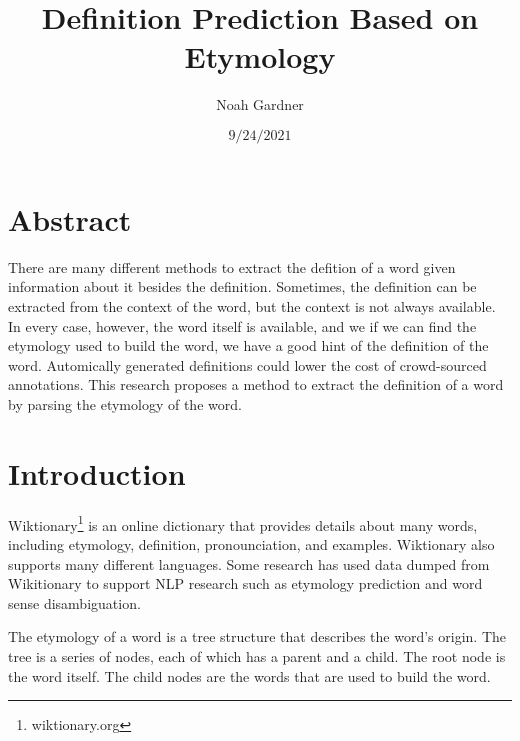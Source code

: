 \documentclass[a4paper,12pt]{article}
\title{Definition Prediction Based on Etymology}
\author[1]{Noah Gardner}
\date{$9/24/2021$}
\affil[1]{College of Computing and Software Engineering, Kennesaw State University}
\begin{document}
\maketitle

\section{Abstract}
There are many different methods to extract the defition of a word given
information about it besides the definition. Sometimes, the definition can be
extracted from the context of the word, but the context is not always available.
In every case, however, the word itself is available, and we if we can find the
etymology used to build the word, we have a good hint of the definition of the
word. Automically generated definitions could lower the cost of crowd-sourced
annotations. This research proposes a method to extract the definition of a word
by parsing the etymology of the word.

\section{Introduction}
Wiktionary\footnote{wiktionary.org} is an online dictionary that provides
details about many words, including etymology, definition, pronounciation, and
examples. Wiktionary also supports many different languages. Some research has
used data dumped from Wikitionary to support NLP research such as etymology
prediction and word sense disambiguation.

The etymology of a word is a tree structure that describes the word's origin.
The tree is a series of nodes, each of which has a parent and a child. The root
node is the word itself. The child nodes are the words that are used to build
the word.
\end{document}
